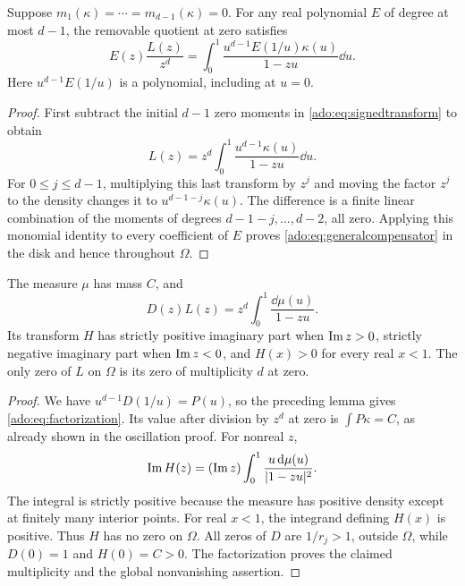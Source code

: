\begin{lemma}
\label{ado:lem:polycancel}
Suppose $m_1(\kappa)=\cdots=m_{d-1}(\kappa)=0$. For any real
polynomial $E$ of degree at most $d-1$, the removable quotient at zero
satisfies
\begin{equation}\label{ado:eq:generalcompensator}
 E(z)\frac{L(z)}{z^d}
 =\int_0^1\frac{u^{d-1}E(1/u)\kappa(u)}{1-zu}\dd u.
\end{equation}
Here $u^{d-1}E(1/u)$ is a polynomial, including at $u=0$.
\end{lemma}
\begin{proof}
First subtract the initial $d-1$ zero moments in
\eqref{ado:eq:signedtransform} to obtain
\[
 L(z)=z^d\int_0^1\frac{u^{d-1}\kappa(u)}{1-zu}\dd u.
\]
For $0\le j\le d-1$, multiplying this last transform by $z^j$
and moving the factor $z^j$ to the density changes it to
$u^{d-1-j}\kappa(u)$. The difference is a finite linear combination
of the moments of degrees $d-1-j,\ldots,d-2$, all zero. Applying
this monomial identity to every coefficient of $E$ proves
\eqref{ado:eq:generalcompensator} in the disk and hence throughout $\Omega$.
\end{proof}

\begin{theorem}
\label{ado:thm:factorization}
The measure $\mu$ has mass $C$, and
\begin{equation}\label{ado:eq:factorization}
 D(z)L(z)=z^d\int_0^1\frac{\dd\mu(u)}{1-zu}.
\end{equation}
Its transform $H$ has strictly positive imaginary part when
$\operatorname{Im} z>0$, strictly negative imaginary part when $\operatorname{Im} z<0$, and
$H(x)>0$ for every real $x<1$. The only zero of $L$ on $\Omega$ is its
zero of multiplicity $d$ at zero.
\end{theorem}
\begin{proof}
We have $u^{d-1}D(1/u)=P(u)$, so the preceding lemma gives
\eqref{ado:eq:factorization}. Its value after division by $z^d$ at
zero is $\int P\kappa=C$, as already shown in the oscillation proof.
For nonreal $z$,
\[
 \operatorname{Im} H(z)=(\operatorname{Im} z)\int_0^1
              \frac{u\,\mathrm d\mu(u)}{|1-zu|^2}.
\]
The integral is strictly positive because the measure has positive
density except at finitely many interior points. For real $x<1$,
the integrand defining $H(x)$ is positive. Thus $H$ has no zero on
$\Omega$. All zeros of $D$ are $1/r_j>1$, outside $\Omega$, while
$D(0)=1$ and $H(0)=C>0$. The factorization proves the claimed
multiplicity and the global nonvanishing assertion.
\end{proof}

